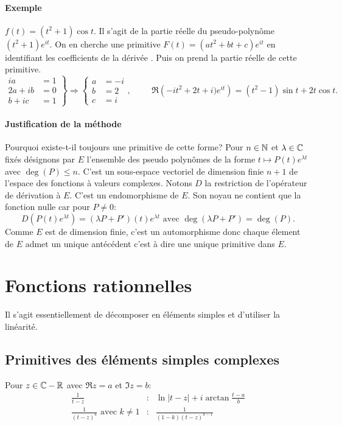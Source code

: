 \paragraph{Exemple} $f(t)=(t^2+1)\cos t$.\newline
Il s'agit de la partie réelle du pseudo-polynôme $(t^2+1)e^{it}$. On en cherche une primitive $F(t) = (at^2 + bt +c)e^{it}$ en identifiant les coefficients de la dérivée . Puis on prend la partie réelle de cette primitive.
\[
\left. 
\begin{aligned}
 ia &= 1 \\
 2a + ib &= 0\\
 b + ic &= 1
\end{aligned}
\right\rbrace \Rightarrow
\left\lbrace 
\begin{aligned}
 a &= -i \\
 b &= 2 \\
 c &= i
\end{aligned}
\right. , \hspace{1cm}
\Re\left( -it^2+2t+i)e^{it}\right) = (t^2 -1)\sin t +2t\cos t. 
\]


\paragraph{Justification de la méthode} Pourquoi existe-t-il toujours une primitive de cette forme? 
Pour $n\in \mathbb{N}$ et $\lambda \in \mathbb{C}$ fixés désignons par $E$ l'ensemble des pseudo polynômes de la forme $t \mapsto P(t)e^{\lambda t}$ avec $\deg(P) \leq n$. \newline
C'est un sous-espace vectoriel de dimension finie $n+1$ de l'espace des fonctions à valeurs complexes. Notons $D$ la restriction de l'opérateur de dérivation à $E$. C'est un endomorphisme de $E$. Son noyau ne contient que la fonction nulle car pour $P\neq 0$:
\[
 D(P(t)e^{\lambda t}) = (\lambda P + P')(t)e^{\lambda t} \text{ avec } \deg(\lambda P + P') = \deg(P).
\]
Comme $E$ est de dimension finie, c'est un automorphisme donc chaque élement de $E$ admet un unique antécédent c'est à dire une unique primitive dans $E$.

\section{Fonctions rationnelles}
Il s'agit essentiellement de décomposer en éléments simples et d'utiliser la linéarité.
\subsection{Primitives des éléments simples complexes}
Pour $z\in\mathbb{C} -\mathbb{R}$ avec $\Re z =a$ et $\Im z=b$:
\begin{align*}
 \frac{1}{t-z}    &:& \ln |t-z| +i \arctan\frac{t-a}{b} \\
\frac{1}{(t-z)^k} \text{ avec } k\neq 1   &:& \frac{1}{(1-k)(t-z)^{k-1}}
\end{align*}

